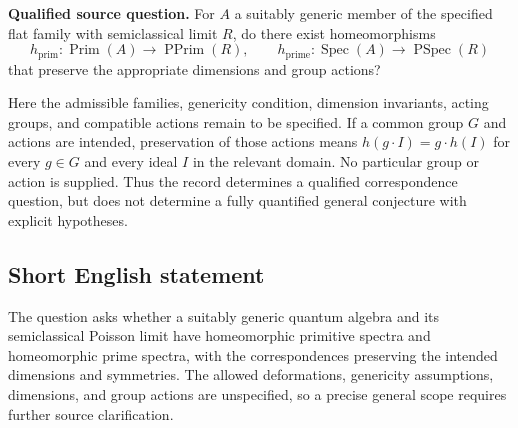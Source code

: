 \documentclass[11pt]{article}
\begin{document}
\textbf{Qualified source question.} For \(A\) a suitably generic member of the specified flat family with semiclassical limit \(R\), do there exist homeomorphisms
\[
h_{\mathrm{prim}}:\operatorname{Prim}(A)\longrightarrow\operatorname{PPrim}(R),
\qquad
h_{\mathrm{prime}}:\operatorname{Spec}(A)\longrightarrow\operatorname{PSpec}(R)
\]
that preserve the appropriate dimensions and group actions?

Here the admissible families, genericity condition, dimension invariants, acting groups, and compatible actions remain to be specified. If a common group \(G\) and actions are intended, preservation of those actions means \(h(g\cdot I)=g\cdot h(I)\) for every \(g\in G\) and every ideal \(I\) in the relevant domain. No particular group or action is supplied. Thus the record determines a qualified correspondence question, but does not determine a fully quantified general conjecture with explicit hypotheses.
\subsection{Short English statement}
The question asks whether a suitably generic quantum algebra and its semiclassical Poisson limit have homeomorphic primitive spectra and homeomorphic prime spectra, with the correspondences preserving the intended dimensions and symmetries. The allowed deformations, genericity assumptions, dimensions, and group actions are unspecified, so a precise general scope requires further source clarification.
\end{document}
